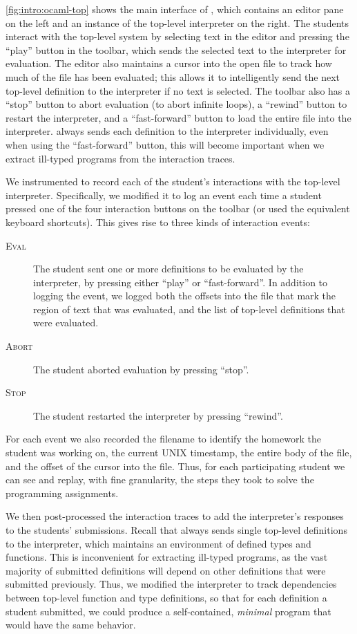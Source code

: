 \autoref{fig:intro:ocaml-top} shows the main interface of \ocamltop,
which contains an editor pane on the left and an instance of the \ocaml
top-level interpreter on the right.
%
The students interact with the top-level system by selecting text in the
editor and pressing the ``play'' button in the toolbar, which sends the
selected text to the interpreter for evaluation.
%
The editor also maintains a cursor into the open file to track how much
of the file has been evaluated; this allows it to intelligently send the
next top-level definition to the interpreter if no text is selected.
%
The toolbar also has a ``stop'' button to abort evaluation (\eg to abort
infinite loops), a ``rewind'' button to restart the interpreter, and a
``fast-forward'' button to load the entire file into the interpreter.
%
\ocamltop always sends each definition to the interpreter individually,
even when using the ``fast-forward'' button, this will become important
when we extract ill-typed programs from the interaction traces.

We instrumented \ocamltop to record each of the student's interactions
with the top-level interpreter.
%
Specifically, we modified it to log an event each time a student pressed
one of the four interaction buttons on the toolbar (or used the
equivalent keyboard shortcuts).
%
This gives rise to three kinds of interaction events:
%
\begin{description}
\item[\textsc{Eval}] The student sent one or more definitions to be
  evaluated by the interpreter, by pressing either ``play'' or
  ``fast-forward''. In addition to logging the event, we logged both the
  offsets into the file that mark the region of text that was evaluated,
  and the list of top-level definitions that were evaluated.
\item[\textsc{Abort}] The student aborted evaluation by pressing
  ``stop''.
\item[\textsc{Stop}] The student restarted the interpreter by pressing
  ``rewind''.
\end{description}
%
For each event we also recorded the filename to identify the homework
the student was working on, the current UNIX timestamp, the entire body
of the file, and the offset of the cursor into the file.
%
Thus, for each participating student we can see and replay, with fine
granularity, the steps they took to solve the programming assignments.

We then post-processed the interaction traces to add the \ocaml
interpreter's responses to the students' submissions.
%
Recall that \ocamltop always sends single top-level definitions to the
interpreter, which maintains an environment of defined types and
functions.
%
This is inconvenient for extracting ill-typed programs, as the vast
majority of submitted definitions will depend on other definitions
that were submitted previously.
%
Thus, we modified the \ocaml interpreter to track dependencies between
top-level function and type definitions, so that for each definition a
student submitted, we could produce a self-contained, \emph{minimal}
program that would have the same behavior.

